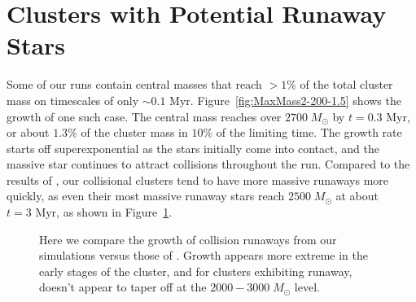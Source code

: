 \documentclass{princeton_astro_thesis}
\newcommand\Msun{\; M_\odot}
\newcommand\msun{\; M_\odot}
\newcommand\Myr{\mbox{ Myr}}
\numberwithin{equation}{section}
\begin{document}
\section{Clusters with Potential Runaway Stars}
Some of our runs contain central masses that reach $> 1\%$ of the total cluster mass on timescales of only $\sim 0.1 \Myr$.  Figure~\ref{fig:MaxMass2-200-1.5} shows the growth of one such case. The central mass reaches over $2700 \Msun$ by $t = 0.3 \Myr$, or about $1.3 \%$ of the cluster mass in $10\%$ of the limiting time. The growth rate starts off superexponential as the stars initially come into contact, and the massive star continues to attract collisions throughout the run.  Compared to the results of \citet{2004SPZ}, our collisional clusters tend to have more massive runaways more quickly, as even their most massive runaway stars reach $2500 \msun$ at about $t = 3 \Myr$, as shown in Figure~\ref{fig:CompareGrowth}.
\begin{figure}%
    \centering
    \qquad   
    \caption{Here we compare the growth of collision runaways from our simulations versus those of \citet{2004SPZ}. Growth appears more extreme in the early stages of the cluster, and for clusters exhibiting runaway, doesn't appear to taper off at the $2000-3000 \Msun$ level.}
    \label{fig:CompareGrowth}
\end{figure}
\end{document}
